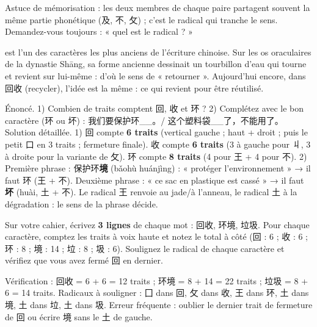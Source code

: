 \documentclass[11pt]{article}
\newcommand{\cle}[1]{{\popxbold\color{popdark}#1}}
\newcounter{popsec}
\newcounter{popsub}
\newcommand{\courssub}[1]{%
  \stepcounter{popsub}%
  \par\vspace{9pt}\noindent{\popxbold\fontsize{11.5}{13}\selectfont\color{popink}{\color{poporange}\thepopsec.\thepopsub}\hspace{6pt}#1}\par\nopagebreak\vspace{4pt}
}
\newcommand{\zh}[1]{\ifmmode\text{#1}\else{#1}\fi}
\begin{document}
Astuce de mémorisation : les deux membres de chaque paire partagent souvent la même partie phonétique (及, 不, 攵) ; c'est le \cle{radical} qui tranche le sens. Demandez-vous toujours : « quel est le radical ? »

\begin{savaistu}
\zh{回} est l'un des caractères les plus anciens de l'écriture chinoise. Sur les os oraculaires de la dynastie Shāng, sa forme ancienne dessinait un \cle{tourbillon d'eau} qui tourne et revient sur lui-même : d'où le sens de « retourner ». Aujourd'hui encore, dans 回收 (recycler), l'idée est la même : ce qui revient pour être réutilisé.
\end{savaistu}

\courssub{Exercice résolu et copie guidée}

\begin{exoresolu}
Énoncé. 1) Combien de traits comptent 回, 收 et 环 ? 2) Complétez avec le bon caractère (环 ou 坏) : 我们要保护环\_\_。/ 这个塑料袋\_\_了，不能用了。
\tcblower
Solution détaillée. 1) 回 compte \textbf{6 traits} (vertical gauche ; haut + droit ; puis le petit 口 en 3 traits ; fermeture finale). 收 compte \textbf{6 traits} (3 à gauche pour 丩, 3 à droite pour la variante de 攵). 环 compte \textbf{8 traits} (4 pour 王 + 4 pour 不). 2) Première phrase : 保护环\textbf{境} (bǎohù huánjìng) : « protéger l'environnement » → il faut 环 (王 + 不). Deuxième phrase : « ce sac en plastique est cassé » → il faut \textbf{坏} (huài, 土 + 不). Le radical 王 renvoie au jade/à l'anneau, le radical 土 à la dégradation : le sens de la phrase décide.
\end{exoresolu}

\begin{exercice}
Sur votre cahier, écrivez \textbf{3 lignes} de chaque mot : 回收, 环境, 垃圾. Pour chaque caractère, comptez les traits à voix haute et notez le total à côté (回 : 6 ; 收 : 6 ; 环 : 8 ; 境 : 14 ; 垃 : 8 ; 圾 : 6). Soulignez le radical de chaque caractère et vérifiez que vous avez fermé 回 en dernier.
\end{exercice}

\begin{corrige}
Vérification : 回收 = 6 + 6 = 12 traits ; 环境 = 8 + 14 = 22 traits ; 垃圾 = 8 + 6 = 14 traits. Radicaux à souligner : 囗 dans 回, 攵 dans 收, 王 dans 环, 土 dans 境, 土 dans 垃, 土 dans 圾. Erreur fréquente : oublier le dernier trait de fermeture de 回 ou écrire 境 sans le 土 de gauche.
\end{corrige}
\end{document}
